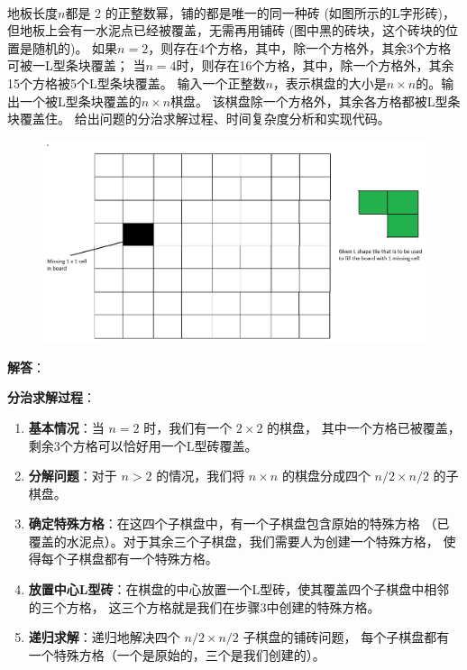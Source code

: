 \documentclass[12pt,twoside]{article}
\begin{document}
\begin{problems}
\newpage
{} \\
地板长度$n$都是 2 的正整数幂，铺的都是唯一的同一种砖 (如图所示的L字形砖)， 
但地板上会有一水泥点已经被覆盖，无需再用铺砖 (图中黑的砖块，这个砖块的位置是随机的)。
如果$n=2$，则存在4个方格，其中，除一个方格外，其余3个方格可被一L型条块覆盖；
当$n=4$时，则存在16个方格，其中，除一个方格外，其余15个方格被5个L型条块覆盖。
输入一个正整数$n$，表示棋盘的大小是$n\times n$的。输出一个被L型条块覆盖的$n\times n$棋盘。
该棋盘除一个方格外，其余各方格都被L型条块覆盖住。
给出问题的分治求解过程、时间复杂度分析和实现代码。
\begin{figure}[h]
   \centering
   \includegraphics[scale=0.15]{fig/tiles.png}
\end{figure}

\textbf{解答}：

\textbf{分治求解过程}：

\begin{enumerate}
\item \textbf{基本情况}：当 $n=2$ 时，我们有一个 $2 \times 2$ 的棋盘，
其中一个方格已被覆盖，剩余3个方格可以恰好用一个L型砖覆盖。

\item \textbf{分解问题}：对于 $n > 2$ 的情况，我们将 $n \times n$ 的棋盘分成四个 
$n/2 \times n/2$ 的子棋盘。

\item \textbf{确定特殊方格}：在这四个子棋盘中，有一个子棋盘包含原始的特殊方格
（已覆盖的水泥点）。对于其余三个子棋盘，我们需要人为创建一个特殊方格，
使得每个子棋盘都有一个特殊方格。

\item \textbf{放置中心L型砖}：在棋盘的中心放置一个L型砖，使其覆盖四个子棋盘中相邻的三个方格，
这三个方格就是我们在步骤3中创建的特殊方格。

\item \textbf{递归求解}：递归地解决四个 $n/2 \times n/2$ 子棋盘的铺砖问题，
每个子棋盘都有一个特殊方格（一个是原始的，三个是我们创建的）。
\end{enumerate}


\end{problems}
\end{document}
